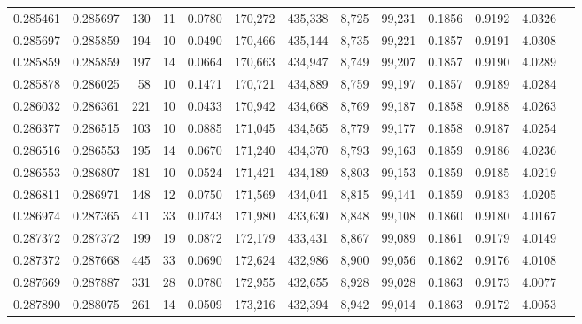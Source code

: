 \begin{tabular}{rrrrrrrrrrrrr}
0.285461 & 0.285697 &   130 &  11 &                                     0.0780 & 170,272 & 435,338 &   8,725 &  99,231 & 0.1856 & 0.9192 & 4.0326 \\
0.285697 & 0.285859 &   194 &  10 &                                     0.0490 & 170,466 & 435,144 &   8,735 &  99,221 & 0.1857 & 0.9191 & 4.0308 \\
0.285859 & 0.285859 &   197 &  14 &                                     0.0664 & 170,663 & 434,947 &   8,749 &  99,207 & 0.1857 & 0.9190 & 4.0289 \\
0.285878 & 0.286025 &    58 &  10 &                                     0.1471 & 170,721 & 434,889 &   8,759 &  99,197 & 0.1857 & 0.9189 & 4.0284 \\
0.286032 & 0.286361 &   221 &  10 &                                     0.0433 & 170,942 & 434,668 &   8,769 &  99,187 & 0.1858 & 0.9188 & 4.0263 \\
0.286377 & 0.286515 &   103 &  10 &                                     0.0885 & 171,045 & 434,565 &   8,779 &  99,177 & 0.1858 & 0.9187 & 4.0254 \\
0.286516 & 0.286553 &   195 &  14 &                                     0.0670 & 171,240 & 434,370 &   8,793 &  99,163 & 0.1859 & 0.9186 & 4.0236 \\
0.286553 & 0.286807 &   181 &  10 &                                     0.0524 & 171,421 & 434,189 &   8,803 &  99,153 & 0.1859 & 0.9185 & 4.0219 \\
0.286811 & 0.286971 &   148 &  12 &                                     0.0750 & 171,569 & 434,041 &   8,815 &  99,141 & 0.1859 & 0.9183 & 4.0205 \\
0.286974 & 0.287365 &   411 &  33 &                                     0.0743 & 171,980 & 433,630 &   8,848 &  99,108 & 0.1860 & 0.9180 & 4.0167 \\
0.287372 & 0.287372 &   199 &  19 &                                     0.0872 & 172,179 & 433,431 &   8,867 &  99,089 & 0.1861 & 0.9179 & 4.0149 \\
0.287372 & 0.287668 &   445 &  33 &                                     0.0690 & 172,624 & 432,986 &   8,900 &  99,056 & 0.1862 & 0.9176 & 4.0108 \\
0.287669 & 0.287887 &   331 &  28 &                                     0.0780 & 172,955 & 432,655 &   8,928 &  99,028 & 0.1863 & 0.9173 & 4.0077 \\
0.287890 & 0.288075 &   261 &  14 &                                     0.0509 & 173,216 & 432,394 &   8,942 &  99,014 & 0.1863 & 0.9172 & 4.0053 \\

\end{tabular}
